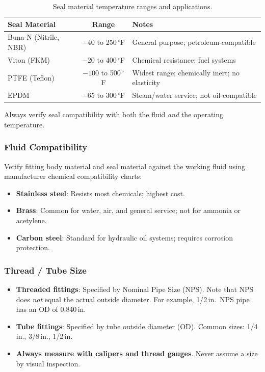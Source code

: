 \begin{table}[htbp]
\centering
\small
\begin{tabularx}{\textwidth}{l c X}
  \toprule
  \textbf{Seal Material} & \textbf{Range} & \textbf{Notes} \\
  \midrule
  Buna-N (Nitrile, NBR) & $-40$ to 250\,$^{\circ}$F & General purpose; petroleum-compatible \\
  Viton (FKM) & $-20$ to 400\,$^{\circ}$F & Chemical resistance; fuel systems \\
  PTFE (Teflon) & $-100$ to 500\,$^{\circ}$F & Widest range; chemically inert; no elasticity \\
  EPDM & $-65$ to 300\,$^{\circ}$F & Steam/water service; not oil-compatible \\
  \bottomrule
\end{tabularx}
\caption{Seal material temperature ranges and applications.}
\end{table}

Always verify seal compatibility with both the fluid \emph{and} the operating temperature.

\subsubsection{Fluid Compatibility}

Verify fitting body material and seal material against the working fluid using manufacturer chemical compatibility charts:
\begin{itemize}[nosep,leftmargin=1.5em]
  \item \textbf{Stainless steel}: Resists most chemicals; highest cost.
  \item \textbf{Brass}: Common for water, air, and general service; not for ammonia or acetylene.
  \item \textbf{Carbon steel}: Standard for hydraulic oil systems; requires corrosion protection.
\end{itemize}

\subsubsection{Thread / Tube Size}

\begin{itemize}[nosep,leftmargin=1.5em]
  \item \textbf{Threaded fittings}: Specified by Nominal Pipe Size (NPS). Note that NPS does \emph{not} equal the actual outside diameter. For example, 1/2\,in.\ NPS pipe has an OD of 0.840\,in.
  \item \textbf{Tube fittings}: Specified by tube outside diameter (OD). Common sizes: 1/4\,in., 3/8\,in., 1/2\,in.
  \item \textbf{Always measure with calipers and thread gauges}. Never assume a size by visual inspection.
\end{itemize}

